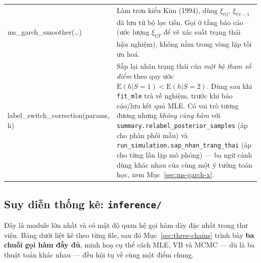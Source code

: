 \documentclass[11pt,a4paper]{article}
\newcommand{\code}[1]{\texttt{#1}}
\newcommand{\file}[1]{\texttt{#1}}
\begin{document}
\begin{longtable}{@{}>{\ttfamily\scriptsize\raggedright\arraybackslash}p{5.0cm} >{\raggedright\arraybackslash}p{9.5cm}@{}}
ms\_garch\_smoother(\ldots) & Làm trơn kiểu Kim (1994), dùng $\xi_{t|t}$, $\xi_{t|t-1}$ đã lưu từ bộ lọc tiến. Gọi ở tầng báo cáo (ước lượng $\xi_{t|T}$ để vẽ xác suất trạng thái hậu nghiệm), không nằm trong vòng lặp tối ưu hoá. \\
label\_switch\_correction(params, h) & Sắp lại nhãn trạng thái của \emph{một bộ tham số điểm} theo quy ước $\mathrm E(h|S{=}1)<\mathrm E(h|S{=}2)$. Dùng sau khi \code{fit\_mle} trả về nghiệm, trước khi báo cáo/lưu kết quả MLE. Có vai trò tương đương nhưng \emph{không cùng hàm} với \code{summary.relabel\_posterior\_samples} (áp cho phân phối mẫu) và \code{run\_simulation.sap\_nhan\_trang\_thai} (áp cho từng lần lặp mô phỏng) --- ba ngữ cảnh dùng khác nhau của cùng một ý tưởng toán học, xem Mục~\ref{sec:ms-garch-x}. \\
\end{longtable}

\subsection{Suy diễn thống kê: \file{inference/}}

Đây là module lớn nhất và có mật độ quan hệ gọi hàm dày đặc nhất trong thư viện. Bảng
dưới liệt kê theo từng file, sau đó Mục~\ref{sec:three-chains} trình bày \textbf{ba
chuỗi gọi hàm đầy đủ}, minh hoạ cụ thể cách MLE, VB và MCMC --- dù là ba thuật toán
khác nhau --- đều hội tụ về cùng một điểm chung.
\end{document}
